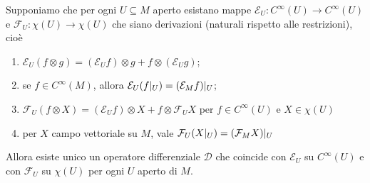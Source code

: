 \begin{theorem} \label{teo:EsistenzaOperatoriDifferenziali}
	Supponiamo che per ogni $U\subseteq M$ aperto esistano mappe $\mathcal E_U : C^\infty(U) \to C^\infty(U)$ e $\mathcal F_U : \chi(U) \to \chi(U)$ che siano derivazioni (naturali rispetto alle restrizioni), cioè
	\begin{enumerate}
		\item $\mathcal E_U(f\otimes g) = (\mathcal E_U f) \otimes g + f \otimes (\mathcal E_U g)$; \label{eod:LeibnitzPerE}
		\item se $f\in C^\infty(M)$, allora $\mathcal E_U(f|_ U) = (\mathcal E_M f)|_ U$; \label{eod:LocalitaPerE}
		\item $\mathcal F_U(f\otimes X) = (\mathcal E_U f) \otimes X + f\otimes \mathcal F_U X$ per $f\in C^\infty(U)$ e $X\in\chi(U)$ \label{eod:LeibnitzPerF}
		\item per $X$ campo vettoriale su $M$, vale $\mathcal F_U(X|_ U) = (\mathcal F_M X)|_ U$ \label{eod:LocalitaPerF}
	\end{enumerate}
	Allora esiste unico un operatore differenziale $\mathcal D$ che coincide con $\mathcal E_U$ su $C^\infty(U)$ e con $\mathcal F_U$ su $\chi(U)$ per ogni $U$ aperto di $M$.

\end{theorem}

